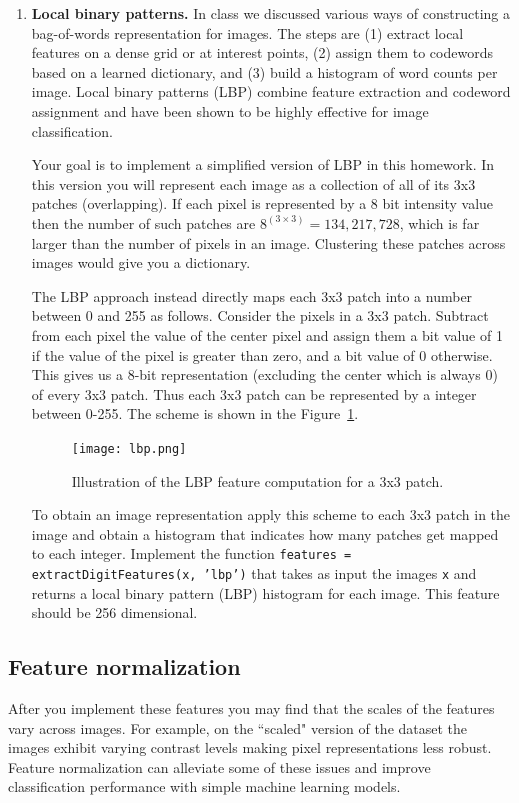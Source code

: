 \documentclass[10pt,letterpaper]{article}
\newcommand{\cmd}[1] {{\color{blue}\texttt{#1}}}
\begin{document}
\begin{enumerate}
\item \textbf{Local binary patterns.} In class we discussed various
  ways of constructing a bag-of-words representation for images. The
  steps are (1) extract local features on a dense grid or at
  interest points, (2) assign them to codewords based on a learned
  dictionary,  and (3) build a histogram of word counts per
  image. Local binary patterns (LBP) combine feature extraction and
  codeword assignment and have been shown to be
  highly effective for image classification.

  Your goal is to implement a simplified version of LBP in this homework. In
this version you will represent each image as a collection of all of
its 3x3 patches (overlapping). If each pixel is represented by a 8 bit
intensity value then the number of such patches are $8^{(3\times
  3)}=134,217,728$, which is far larger than the number of pixels in
an image. Clustering these patches across images would give you a
dictionary. 


The LBP approach instead directly maps each 3x3 patch into a number
between 0 and 255 as follows. Consider the pixels in a 3x3
patch. Subtract from each pixel the value of the center pixel and assign
them a bit value of 1 if the value of the pixel is greater than zero,
and a bit value of 0 otherwise. This gives us a 8-bit representation (excluding the
center which is always 0) of every 3x3 patch. Thus each 3x3 patch can
be represented by a integer between 0-255. The scheme is shown in the
Figure~\ref{fig:lbp}.


\begin{figure}[h]
\centering
\texttt{[image: lbp.png]}
\caption{\label{fig:lbp} Illustration of the LBP feature computation for a 3x3 patch.} 
\end{figure}

To obtain an image representation apply this scheme to each 3x3 patch
in the image and obtain a histogram that indicates how many patches
get mapped to each integer. Implement the function \cmd{features =
  extractDigitFeatures(x, 'lbp')} that takes as input the images
\cmd{x} and returns a local binary pattern (LBP) histogram for each
image. This feature should be 256 dimensional.
\end{enumerate}

\subsection{Feature normalization}

After you implement these features you may find that the scales of the
features vary across images. For example, on the ``scaled"
version of the dataset the images exhibit varying contrast levels
making pixel representations less robust. 
Feature normalization can alleviate some of these issues and improve
classification performance with simple machine learning models. 
\end{document}
